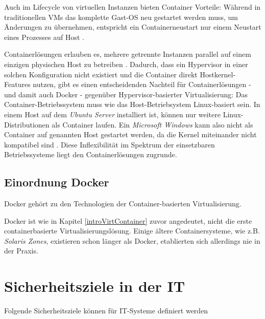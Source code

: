 \documentclass[../main.tex]{subfiles}
\begin{document}
      Auch im Lifecycle von virtuellen Instanzen bieten Container Vorteile: Während in traditionellen \acrshort{VM}s das komplette Gast-\acrshort{OS} neu gestartet werden muss, um Änderungen zu übernehmen, entspricht ein Containerneustart nur einem Neustart eines Prozesses auf Host \cite[S.2]{dockerLXCKub}.

      Containerlösungen erlauben es, mehrere getrennte Instanzen parallel auf einem einzigen physischen Host zu betreiben \cite[S.6]{dockerBook}. Dadurch, dass ein Hypervisor in einer solchen Konfiguration nicht existiert und die Container direkt Hostkernel-Features nutzen, gibt es einen entscheidenden Nachteil für Containerlösungen - und damit auch Docker - gegenüber Hypervisor-basierter Virtualisierung: Das Container-Betriebssystem muss wie das Host-Betriebsystem Linux-basiert sein. In einem Host auf dem \emph{Ubuntu Server} installiert ist, können nur weitere Linux-Distributionen als Container laufen. Ein \emph{Microsoft Windows} kann also nicht als Container auf genannten Host gestartet werden, da die Kernel miteinander nicht kompatibel sind \cite[S.6]{dockerBook}. Diese Inflexibilität im Spektrum der einsetzbaren Betriebssysteme liegt den Containerlösungen zugrunde.

	  \subsection{Einordnung Docker}
      Docker gehört zu den Technologien der Container-basierten Virtualisierung.


      Docker ist wie in Kapitel \ref{introVirtContainer} zuvor angedeutet, nicht die erste containerbasierte Virtualisierungslösung. Einige ältere Containersysteme, wie z.B. \emph{Solaris Zones}, existieren schon länger als Docker, etablierten sich allerdings nie in der Praxis.
  \section{Sicherheitsziele in der IT}
  \label{introSecGoals}
		Folgende Sicherheitsziele können für \acrshort{IT}-Systeme definiert werden
\end{document}

